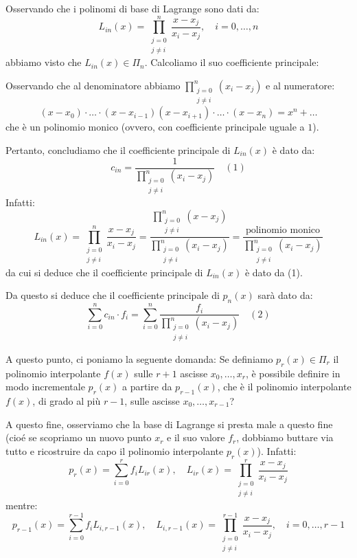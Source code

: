 Osservando che i polinomi di base di Lagrange sono dati da:
$$L_{in}(x) = \prod_{\substack{j=0 \\ j \neq i}}^{n} \frac{x-x_j}{x_i-x_j}, \quad i=0,\dots,n$$
abbiamo visto che $L_{in}(x) \in \Pi_n$. Calcoliamo il suo coefficiente principale:

Osservando che al denominatore abbiamo $\prod_{\substack{j=0 \\ j \neq i}}^{n} (x_i-x_j)$ e al numeratore:
$$(x-x_0) \cdot \dots \cdot (x-x_{i-1})(x-x_{i+1}) \cdot \dots \cdot (x-x_n) = x^n + \dots$$
che è un polinomio monico (ovvero, con coefficiente principale uguale a $1$).

Pertanto, concludiamo che il coefficiente principale di $L_{in}(x)$ è dato da:
$$c_{in} = \frac{1}{\prod_{\substack{j=0 \\ j \neq i}}^{n} (x_i-x_j)} \quad (1)$$
Infatti:
$$L_{in}(x) = \prod_{\substack{j=0 \\ j \neq i}}^{n} \frac{x-x_j}{x_i-x_j} = \frac{\prod_{\substack{j=0 \\ j \neq i}}^{n} (x-x_j)}{\prod_{\substack{j=0 \\ j \neq i}}^{n} (x_i-x_j)} = \frac{\text{polinomio monico}}{\prod_{\substack{j=0 \\ j \neq i}}^{n} (x_i-x_j)}$$
da cui si deduce che il coefficiente principale di $L_{in}(x)$ è dato da (1).

Da questo si deduce che il coefficiente principale di $p_n(x)$ sarà dato da:
$$\sum_{i=0}^{n} c_{in} \cdot f_i = \sum_{i=0}^{n} \frac{f_i}{\prod_{\substack{j=0 \\ j \neq i}}^{n} (x_i-x_j)} \quad (2)$$

A questo punto, ci poniamo la seguente domanda:
Se definiamo $p_r(x) \in \Pi_r$ il polinomio interpolante $f(x)$ sulle $r+1$ ascisse $x_0, \dots, x_r$, è possibile definire in modo incrementale $p_r(x)$ a partire da $p_{r-1}(x)$, che è il polinomio interpolante $f(x)$, di grado al più $r-1$, sulle ascisse $x_0, \dots, x_{r-1}$?

A questo fine, osserviamo che la base di Lagrange si presta male a questo fine (cioé se scopriamo un nuovo punto $x_r$ e il suo valore $f_r$, dobbiamo buttare via tutto e ricostruire da capo il polinomio interpolante $p_r(x)$). Infatti:
$$p_r(x) = \sum_{i=0}^{r} f_i L_{ir}(x), \quad L_{ir}(x) = \prod_{\substack{j=0 \\ j \neq i}}^{r} \frac{x-x_j}{x_i-x_j}$$
mentre:
$$p_{r-1}(x) = \sum_{i=0}^{r-1} f_i L_{i,r-1}(x), \quad L_{i,r-1}(x) = \prod_{\substack{j=0 \\ j \neq i}}^{r-1} \frac{x-x_j}{x_i-x_j}, \quad i=0,\dots,r-1$$

